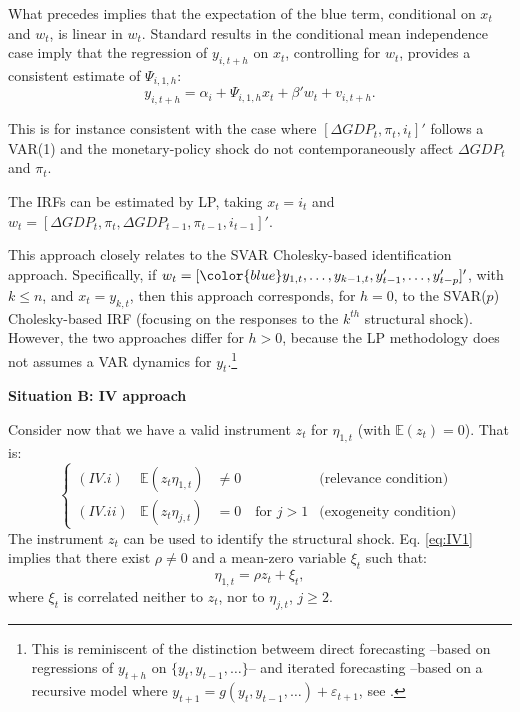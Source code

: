 \documentclass[
  12pt,
]{book}
\theoremstyle{definition}
\theoremstyle{definition}
\theoremstyle{definition}
\theoremstyle{definition}
\theoremstyle{remark}
\begin{document}
What precedes implies that the expectation of the blue term, conditional on \(x_t\) and \(w_t\), is linear in \(w_t\). Standard results in the conditional mean independence case imply that the regression of \(y_{i,t+h}\) on \(x_t\), controlling for \(w_t\), provides a consistent estimate of \(\Psi_{i,1,h}\):
\begin{equation}
y_{i,t+h} = \alpha_i + \Psi_{i,1,h}x_t + \beta'w_t + v_{i,t+h}.
\end{equation}

This is for instance consistent with the case where \([\Delta GDP_t, \pi_t,i_t]'\) follows a VAR(1) and the monetary-policy shock do not contemporaneously affect \(\Delta GDP_t\) and \(\pi_t\).

The IRFs can be estimated by LP, taking \(x_t = i_t\) and \(w_t = [\Delta GDP_t,\pi_t,\Delta GDP_{t-1}, \pi_{t-1},i_{t-1}]'\).

This approach closely relates to the SVAR Cholesky-based identification approach. Specifically, if \(w_t = [{\color{blue}y_{1,t},\dots,y_{k-1,t}}, y_{t-1}',\dots,y_{t-p}']'\), with \(k\le n\), and \(x_t = y_{k,t}\), then this approach corresponds, for \(h=0\), to the SVAR(\(p\)) Cholesky-based IRF (focusing on the responses to the \(k^{th}\) structural shock). However, the two approaches differ for \(h>0\), because the LP methodology does not assumes a VAR dynamics for \(y_t\).\footnote{This is reminiscent of the distinction betweem direct forecasting --based on regressions of \(y_{t+h}\) on \(\{y_t,y_{t-1},\dots\}\)-- and iterated forecasting --based on a recursive model where \(y_{t+1} = g(y_t,y_{t-1},\dots)+\varepsilon_{t+1}\), see \citet{Marcellino_et_al_2006}.}

\textbf{Situation B: IV approach}

Consider now that we have a valid instrument \(z_t\) for \(\eta_{1,t}\) (with \(\mathbb{E}(z_t)=0\)). That is:
\begin{equation}
\left\{
\begin{array}{llll}
(IV.i) & \mathbb{E}(z_t \eta_{1,t}) &\ne 0 & \mbox{(relevance condition)} \\
(IV.ii) & \mathbb{E}(z_t \eta_{j,t}) &= 0 \quad \mbox{for } j>1 & \mbox{(exogeneity condition)}
\end{array}\right.\label{eq:IV1}
\end{equation}
The instrument \(z_t\) can be used to identify the structural shock. Eq. \eqref{eq:IV1} implies that there exist \(\rho \ne 0\) and a mean-zero variable \(\xi_t\) such that:
\[
\eta_{1,t} = \rho z_t + \xi_t,
\]
where \(\xi_t\) is correlated neither to \(z_t\), nor to \(\eta_{j,t}\), \(j\ge2\).
\end{document}
